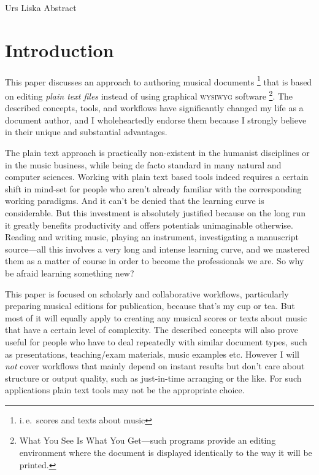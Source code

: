 \documentclass[../../LilyPond-Tutorials]{subfiles}
\begin{document}
\begin{authorAbstract}{Urs Liska}
Abstract
\end{authorAbstract}

\chapter*{Introduction}
\label{chap:pt_introduction}
This paper discusses an approach to authoring musical documents%
\footnote{i.\,e.\ scores and texts about music}
that is based on editing \emph{plain text files} instead of using graphical \textsc{wysiwyg} software%
\footnote{What You See Is What You Get---such programs provide an editing environment where the document is displayed identically to the way it will be printed.}.
The described concepts, tools, and workflows have significantly changed my life as a document author, and I  wholeheartedly endorse them because I strongly believe in their unique and substantial advantages.

The plain text approach is practically non-existent in the humanist disciplines or in the music business, while being de facto standard in many natural and computer sciences.
Working with plain text based tools indeed requires a certain shift in mind-set for people who aren't already familiar with the corresponding working paradigms.
And it can't be denied that the learning curve is considerable.
But this investment is absolutely justified because on the long run it greatly benefits productivity and offers potentials unimaginable otherwise.
Reading and writing music, playing an instrument, investigating a manuscript source---all this involves a very long and intense learning curve, and we mastered them as a matter of course in order to become the professionals we are.
So why be afraid learning something new?

This paper is focused on scholarly and collaborative workflows, particularly preparing musical editions for publication, because that's my cup or tea.
But most of it will equally apply to creating any musical scores or texts about music that have a certain level of complexity.
The described concepts will also prove useful for people who have to deal repeatedly with similar document types, such as presentations, teaching/exam materials, music examples etc.
However I will \emph{not} cover workflows that mainly depend on instant results but don't care about structure or output quality, such as just-in-time arranging or the like.
For such applications plain text tools may not be the appropriate choice.
\end{document}
